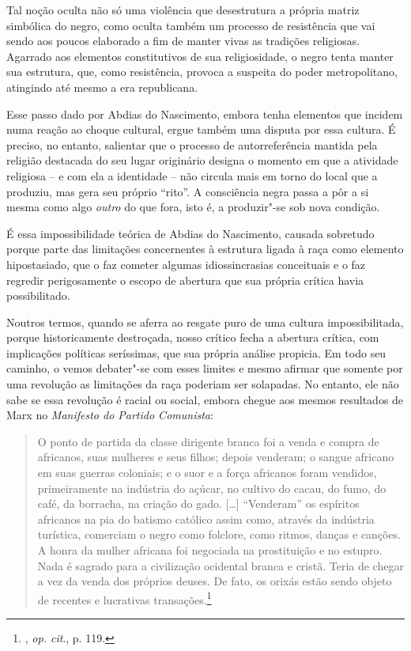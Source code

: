 Tal noção oculta não só uma violência que desestrutura a própria matriz
simbólica do negro, como oculta também um processo de resistência que
vai sendo aos poucos elaborado a fim de manter vivas as tradições
religiosas. Agarrado aos elementos constitutivos de sua religiosidade, o
negro tenta manter sua estrutura, que, como resistência, provoca a
suspeita do poder metropolitano, atingindo até mesmo a era republicana.

Esse passo dado por Abdias do Nascimento, embora tenha elementos que
incidem numa reação ao choque cultural, ergue também uma disputa por
essa cultura. É preciso, no entanto, salientar que o processo de
autorreferência mantida pela religião destacada do seu lugar originário
designa o momento em que a atividade religiosa -- e com ela a identidade
-- não circula mais em torno do local que a produziu, mas gera seu
próprio ``rito''. A consciência negra passa a pôr a si mesma como algo
\emph{outro} do que fora, isto é, a produzir"-se sob nova condição.

É essa impossibilidade teórica de Abdias do Nascimento, causada
sobretudo porque parte das limitações concernentes à estrutura ligada à
raça como elemento hipostasiado, que o faz cometer algumas
idiossincrasias conceituais e o faz regredir perigosamente o escopo de
abertura que sua própria crítica havia possibilitado.

Noutros termos, quando se aferra ao resgate puro de uma cultura
impossibilitada, porque historicamente destroçada, nosso crítico fecha a
abertura crítica, com implicações políticas seríssimas, que sua própria
análise propicia. Em todo seu caminho, o vemos debater"-se com esses
limites e mesmo afirmar que somente por uma revolução as limitações da
raça poderiam ser solapadas. No entanto, ele não sabe se essa revolução
é racial ou social, embora chegue aos mesmos resultados de Marx no
\emph{Manifesto do Partido Comunista}:

\begin{quote}
O ponto de partida da classe dirigente branca foi a venda e compra de
africanos, suas mulheres e seus filhos; depois venderam; o sangue
africano em suas guerras coloniais; e o suor e a força africanos foram
vendidos, primeiramente na indústria do açúcar, no cultivo do cacau, do
fumo, do café, da borracha, na criação do gado. {[}\ldots{}{]} ``Venderam'' os
espíritos africanos na pia do batismo católico assim como, através da
indústria turística, comerciam o negro como folclore, como ritmos,
danças e canções. A honra da mulher africana foi negociada na
prostituição e no estupro. Nada é sagrado para a civilização ocidental
branca e cristã. Teria de chegar a vez da venda dos próprios deuses. De
fato, os orixás estão sendo objeto de recentes e lucrativas
transações.\footnote{, \emph{op. cit}., p. 119.}
\end{quote}

